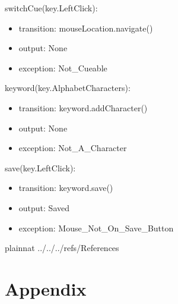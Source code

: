 \documentclass[12pt, titlepage]{article}
\begin{document}
\noindent switchCue(key.LeftClick):
\begin{itemize}
\item transition: mouseLocation.navigate() 
\item output: None
\item exception: Not\_Cueable 
\end{itemize}

\noindent keyword(key.AlphabetCharacters):
\begin{itemize}
\item transition: keyword.addCharacter()
\item output: None
\item exception: Not\_A\_Character 
\end{itemize}

\noindent save(key.LeftClick):
\begin{itemize}
\item transition: keyword.save() 
\item output: Saved
\item exception: Mouse\_Not\_On\_Save\_Button 
\end{itemize}


 {plainnat}
 {../../../refs/References}

\newpage

\section{Appendix} \label{Appendix}

\end{document}
